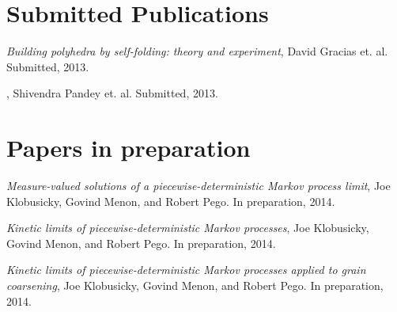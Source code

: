 \section*{\sc Submitted Publications}
{\it Building polyhedra by self-folding: theory and experiment}, David Gracias et. al.
Submitted,  2013. 

 \hspace{-18pt}{\it Self-assembly of mesoscale octahedral isomers},
 Shivendra Pandey et. al. Submitted,  2013.

     
\section*{\sc Papers in preparation}
 {\it Measure-valued solutions of a piecewise-deterministic Markov process limit}, Joe Klobusicky, Govind Menon, and Robert Pego.  In preparation, 2014.

 {\it \hspace{-18pt}Kinetic limits of piecewise-deterministic Markov processes}, Joe Klobusicky, Govind Menon, and Robert Pego. In preparation, 2014.

 {\it \hspace{-18pt}Kinetic limits of piecewise-deterministic Markov processes applied to grain coarsening}, Joe Klobusicky, Govind Menon, and Robert Pego. In preparation, 2014.


  













